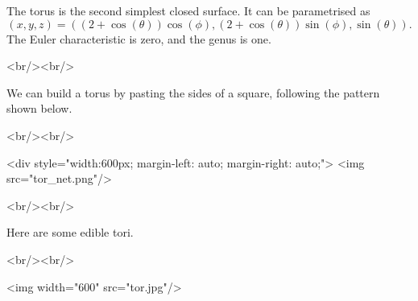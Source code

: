 The torus is the second simplest closed surface.  It can be parametrised as
$$ (x,y,z) = ((2+\cos(\theta))\cos(\phi), (2+\cos(\theta))\sin(\phi),\sin(\theta)). $$
The Euler characteristic is zero, and the genus is one.

<br/><br/>

We can build a torus by pasting the sides of a square,
following the pattern shown below.

<br/><br/>

<div style="width:600px; margin-left: auto; margin-right: auto;">
<img src="tor_net.png"/>

<br/><br/>

Here are some edible tori.

<br/><br/>

<img width="600" src="tor.jpg"/>
